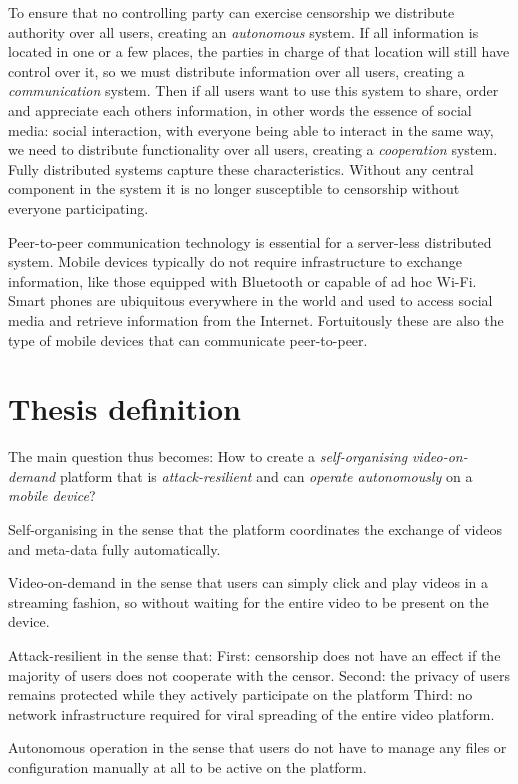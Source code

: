 To ensure that no controlling party can exercise censorship we distribute authority over all users, creating an \emph{autonomous} system.
If all information is located in one or a few places, the parties in charge of that location will still have control over it, so we must distribute information over all users, creating a \emph{communication} system.
Then if all users want to use this system to share, order and appreciate each others information, in other words the essence of social media: social interaction, with everyone being able to interact in the same way, we need to  distribute functionality over all users, creating a \emph{cooperation} system.
Fully distributed systems capture these characteristics. %
Without any central component in the system it is no longer susceptible to censorship without everyone participating.

Peer-to-peer communication technology is essential for a server-less distributed system.
Mobile devices typically do not require infrastructure to exchange information, like those equipped with Bluetooth or capable of ad hoc Wi-Fi.
Smart phones are ubiquitous everywhere in the world and used to access social media and retrieve information from the Internet.
Fortuitously these are also the type of mobile devices that can communicate peer-to-peer.

\section{Thesis definition}
The main question thus becomes:
How to create a \emph{self-organising} \emph{video-on-demand} platform that is \emph{attack-resilient} and can \emph{operate autonomously} on a \emph{mobile device}?

Self-organising in the sense that the platform coordinates the exchange of videos and meta-data fully automatically.

Video-on-demand in the sense that users can simply click and play videos in a streaming fashion, so without waiting for the entire video to be present on the device.

Attack-resilient in the sense that:
First: censorship does not have an effect if the majority of users does not cooperate with the censor.
Second: the privacy of users remains protected while they actively participate on the platform
Third: no network infrastructure required for viral spreading of the entire video platform.

Autonomous operation in the sense that users do not have to manage any files or configuration manually at all to be active on the platform.

